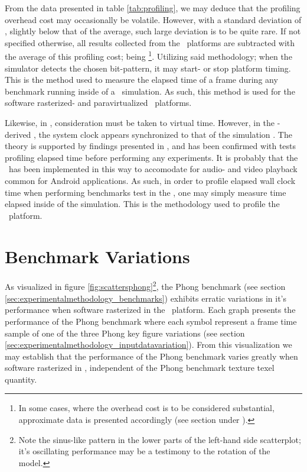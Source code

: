 

From the data presented in table \ref{tab:profiling}, we may deduce that the profiling overhead cost may occasionally be volatile.
However, with a standard deviation of , slightly below that of the average, such large deviation is to be quite rare.
If not specified otherwise, all results collected from the \dvttermsimics\ platforms are subtracted with the average of this profiling cost; being \footnote{In some cases, where the overhead cost is to be considered substantial, approximate data is presented accordingly (see section  under ).}.
Utilizing said methodology; when the simulator detects the chosen bit-pattern, it may start- or stop platform timing.
This is the method used to measure the elapsed time of a frame during any benchmark running inside of a \dvttermsimics\ simulation.
As such, this method is used for the software rasterized- and paravirtualized \dvttermsimics\ platforms. 

Likewise, in \dvttermqemu , consideration must be taken to virtual time.
However, in the \dvttermqemu -derived \dvttermandroidemulator , the system clock appears synchronized to that of the simulation \dvttermhost {}.
The theory is supported by findings presented in , and has been confirmed with tests profiling elapsed time before performing any experiments.
It is probably that the \dvttermandroidemulator\ has been implemented in this way to accomodate for audio- and video playback common for Android applications.
As such, in order to profile elapsed wall clock time when performing benchmarks test in the \dvttermandroidemulator , one may simply measure time elapsed inside of the simulation.
This is the methodology used to profile the \dvttermqemu\ platform.

\section{Benchmark Variations}
\label{sec:threatstovalidity_benchmarkvariations}
As visualized in figure \ref{fig:scattersphong}\footnote{Note the sinus-like pattern in the lower parts of the left-hand side scatterplot; it's oscillating performance may be a testimony to the rotation of the model.}, the Phong benchmark (see section \ref{sec:experimentalmethodology_benchmarks}) exhibits erratic variations in it's performance when software rasterized in the \dvttermsimics\ platform.
Each graph presents the performance of the Phong benchmark where each symbol represent a frame time sample of one of the three Phong key figure variations (see section \ref{sec:experimentalmethodology_inputdatavariation}).
From this visualization we may establish that the performance of the Phong benchmark varies greatly when software rasterized in \dvttermsimics , independent of the Phong benchmark texture texel quantity.

